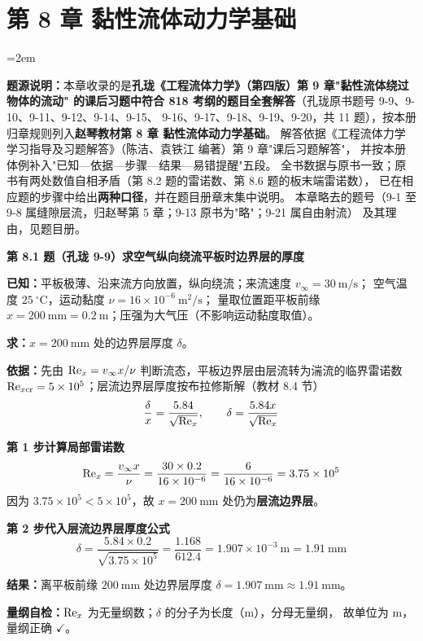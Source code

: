 \chapter*{第 8 章 黏性流体动力学基础}


\sloppy
\emergencystretch=2em

\begin{tishi}
\textbf{题源说明：}本章收录的是\textbf{孔珑《工程流体力学》（第四版）第 9 章"黏性流体绕过物体的流动"
的课后习题中符合 818 考纲的题目全套解答}（孔珑原书题号 9-9、9-10、9-11、9-12、9-14、9-15、
9-16、9-17、9-18、9-19、9-20，共 11 题），按本册归章规则列入\textbf{赵琴教材第 8 章 黏性流体动力学基础}。
解答依据《工程流体力学 学习指导及习题解答》（陈洁、袁铁江 编著）第 9 章"课后习题解答"，
并按本册体例补入"已知—依据—步骤—结果—易错提醒"五段。
全书数据与原书一致；原书有两处数值自相矛盾（第 8.2 题的雷诺数、第 8.6 题的板末端雷诺数），
已在相应题的步骤中给出\textbf{两种口径}，并在题目册章末集中说明。
本章略去的题号（9-1 至 9-8 属缝隙层流，归赵琴第 5 章；9-13 原书为"略"；9-21 属自由射流）
及其理由，见题目册。
\end{tishi}

\noindent\textbf{第 8.1 题（孔珑 9-9）\quad 求空气纵向绕流平板时边界层的厚度}

\begin{jie}
\textbf{已知：}平板极薄、沿来流方向放置，纵向绕流；来流速度 $v_\infty=30\ \mathrm{m/s}$；
空气温度 $25\ ^{\circ}\mathrm{C}$，运动黏度 $\nu=16\times10^{-6}\ \mathrm{m^2/s}$；
量取位置距平板前缘 $x=200\ \mathrm{mm}=0.2\ \mathrm{m}$；压强为大气压（不影响运动黏度取值）。

\textbf{求：}$x=200\ \mathrm{mm}$ 处的边界层厚度 $\delta$。

\textbf{依据：}先由 $\mathrm{Re}_x=v_\infty x/\nu$ 判断流态，平板边界层由层流转为湍流的临界雷诺数
$\mathrm{Re}_{x\mathrm{cr}}=5\times10^{5}$；层流边界层厚度按布拉修斯解（教材 8.4 节）
\[ \frac{\delta}{x}=\frac{5.84}{\sqrt{\mathrm{Re}_x}},\qquad \delta=\frac{5.84x}{\sqrt{\mathrm{Re}_x}} \]

\textbf{第 1 步\quad 计算局部雷诺数}
\[ \mathrm{Re}_x=\frac{v_\infty x}{\nu}=\frac{30\times0.2}{16\times10^{-6}}=\frac{6}{16\times10^{-6}}=3.75\times10^{5} \]
因为 $3.75\times10^{5}<5\times10^{5}$，故 $x=200\ \mathrm{mm}$ 处仍为\textbf{层流边界层}。

\textbf{第 2 步\quad 代入层流边界层厚度公式}
\[ \delta=\frac{5.84\times0.2}{\sqrt{3.75\times10^{5}}}=\frac{1.168}{612.4}=1.907\times10^{-3}\ \mathrm{m}=1.91\ \mathrm{mm} \]

\textbf{结果：}离平板前缘 $200\ \mathrm{mm}$ 处边界层厚度 $\delta=1.907\ \mathrm{mm}\approx1.91\ \mathrm{mm}$。

\textbf{量纲自检：}$\mathrm{Re}_x$ 为无量纲数；$\delta$ 的分子为长度（$\mathrm{m}$），分母无量纲，
故单位为 $\mathrm{m}$，量纲正确 $\checkmark$。
\end{jie}

